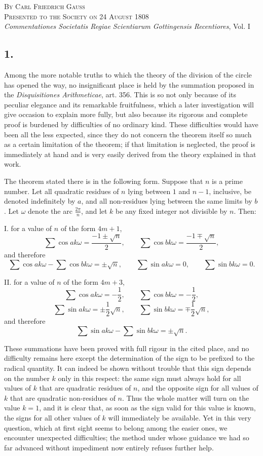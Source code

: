\documentclass[12pt]{article}
\begin{document}
\begin{center}
\textsc{By Carl Friedrich Gauss}\\
\textsc{Presented to the Society on 24 August 1808}\\[3pt]
\emph{Commentationes Societatis Regiae Scientiarum Gottingensis Recentiores}, Vol. I
\end{center}

\subsection*{1.}

Among the more notable truths to which the theory of the division of the circle has opened the way, no insignificant place is held by the summation proposed in the \emph{Disquisitiones Arithmeticae}, art. 356. This is so not only because of its peculiar elegance and its remarkable fruitfulness, which a later investigation will give occasion to explain more fully, but also because its rigorous and complete proof is burdened by difficulties of no ordinary kind. These difficulties would have been all the less expected, since they do not concern the theorem itself so much as a certain limitation of the theorem; if that limitation is neglected, the proof is immediately at hand and is very easily derived from the theory explained in that work.

The theorem stated there is in the following form. Suppose that $n$ is a prime number. Let all quadratic residues of $n$ lying between $1$ and $n-1$, inclusive, be denoted indefinitely by $a$, and all non-residues lying between the same limits by $b$. Let $\omega$ denote the arc $\frac{2\pi}{n}$, and let $k$ be any fixed integer not divisible by $n$. Then:

I. for a value of $n$ of the form $4m+1$,
\[
\sum \cos ak\omega=\frac{-1\pm\sqrt n}{2},\qquad
\sum \cos bk\omega=\frac{-1\mp\sqrt n}{2},
\]
and therefore
\[
\sum \cos ak\omega-\sum \cos bk\omega=\pm\sqrt n,\qquad
\sum \sin ak\omega=0,\qquad \sum \sin bk\omega=0.
\]

II. for a value of $n$ of the form $4m+3$,
\[
\sum \cos ak\omega=-\frac12,\qquad
\sum \cos bk\omega=-\frac12,
\]
\[
\sum \sin ak\omega=\pm\frac12\sqrt n,\qquad
\sum \sin bk\omega=\mp\frac12\sqrt n,
\]
and therefore
\[
\sum \sin ak\omega-\sum \sin bk\omega=\pm\sqrt n.
\]

These summations have been proved with full rigour in the cited place, and no difficulty remains here except the determination of the sign to be prefixed to the radical quantity. It can indeed be shown without trouble that this sign depends on the number $k$ only in this respect: the same sign must always hold for all values of $k$ that are quadratic residues of $n$, and the opposite sign for all values of $k$ that are quadratic non-residues of $n$. Thus the whole matter will turn on the value $k=1$, and it is clear that, as soon as the sign valid for this value is known, the signs for all other values of $k$ will immediately be available. Yet in this very question, which at first sight seems to belong among the easier ones, we encounter unexpected difficulties; the method under whose guidance we had so far advanced without impediment now entirely refuses further help.
\end{document}

